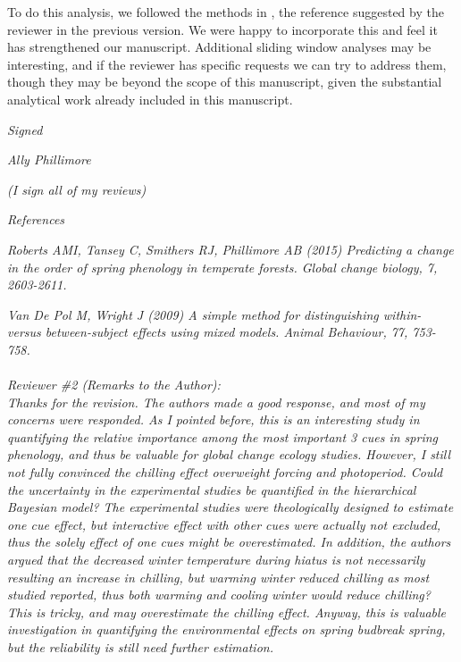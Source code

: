 \documentclass[11pt, a4paper]{article}
\begin{document}
To do this analysis, we followed the methods in , the reference suggested by the reviewer in the previous version. We were happy to incorporate this and feel it has strengthened our manuscript. Additional sliding window analyses may be interesting, and if the reviewer has specific requests we can try to address them, though they may be beyond the scope of this manuscript, given the substantial analytical work already included in this manuscript.

\par \emph{Signed}
\par \emph{Ally Phillimore}
\par \emph{(I sign all of my reviews)}
\par \emph{References}
\par \emph{Roberts AMI, Tansey C, Smithers RJ, Phillimore AB (2015) Predicting a change in the order of spring
phenology in temperate forests. Global change biology, 7, 2603-2611.}
\par \emph{Van De Pol M, Wright J (2009) A simple method for distinguishing within- versus between-subject effects
using mixed models. Animal Behaviour, 77, 753-758.}
\\
\\
 \emph{Reviewer \#2 (Remarks to the Author):}\\

\emph{Thanks for the revision. The authors made a good response, and most of my concerns were responded. As I pointed before, this is an interesting study in quantifying the relative importance among the most important 3 cues in spring phenology, and thus be valuable for global change ecology studies. However, I still not fully convinced the chilling effect overweight forcing and photoperiod. Could the uncertainty in the experimental studies be quantified in the hierarchical Bayesian model? The experimental studies were theologically designed to estimate one cue effect, but interactive effect with other cues were actually not excluded, thus the solely effect of one cues might be overestimated. In addition, the authors argued that the decreased winter temperature during hiatus is not necessarily resulting an increase in chilling, but warming winter reduced chilling as most studied reported, thus both warming and cooling winter would reduce chilling? This is tricky, and may overestimate
the chilling effect. Anyway, this is valuable investigation in quantifying the environmental effects on spring budbreak spring, but the reliability is still need further estimation.
}\\
\end{document}
